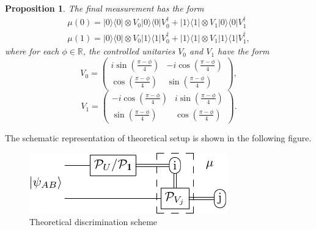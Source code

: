 \documentclass[preprint,12pt, a4paper]{elsarticle}
\newcommand{\ket}[1]{\ensuremath{|#1\rangle}}
\newcommand{\bra}[1]{\ensuremath{\langle#1|}}
\newcommand{\ketbra}[2]{\ensuremath{\ket{#1}\bra{#2}}}
\newcommand{\proj}[1]{\ensuremath{\ketbra{#1}{#1}}}
\newcommand{\1}{{\rm 1\hspace{-0.9mm}l}}
\newtheorem{proposition}{Proposition}
\begin{document}
\begin{proposition}
The  final measurement has the form
\begin{equation}
\begin{split}
\mu(0) = \proj{0} \otimes V_0 \proj{0} V_0^\dagger +  \proj{1} \otimes V_1 
\proj{0} V_1^\dagger  \\ 
\mu(1) = \proj{0} \otimes V_0 \proj{1} V_0^\dagger +  \proj{1} \otimes V_1 
\proj{1} V_1^\dagger,
\end{split}
\end{equation}
where for each $\phi \in \mathbb{R}$,  the controlled unitaries $V_0$ and $V_1$ 
have the form
\begin{equation}
V_0 = \left(\begin{array}{cc}i \sin\left( \frac{\pi - \phi}{4} \right)&-i 
\cos\left( \frac{\pi - \phi}{4} \right)\\ \cos\left( \frac{\pi - 
\phi}{4}\right)& \sin\left( \frac{\pi - \phi}{4} \right)\end{array}\right),
\end{equation}
\begin{equation}
V_1 = \left(\begin{array}{cc}-i \cos\left(\frac{\pi - \phi}{4}\right) &i 
\sin\left( \frac{\pi - \phi}{4}\right)\\\sin\left( \frac{\pi - \phi}{4} \right) 
&  \cos\left( \frac{\pi - \phi}{4} \right) \end{array}\right).
\end{equation}
\end{proposition}

The schematic representation of theoretical setup is shown in the following 
figure. 

\begin{figure}[h!]
\centering
\includegraphics[scale=1.2]{pics/theoretical_scheme}
\caption{Theoretical discrimination scheme}
\label{fig:theoretical_scheme}
\end{figure}
\end{document}
